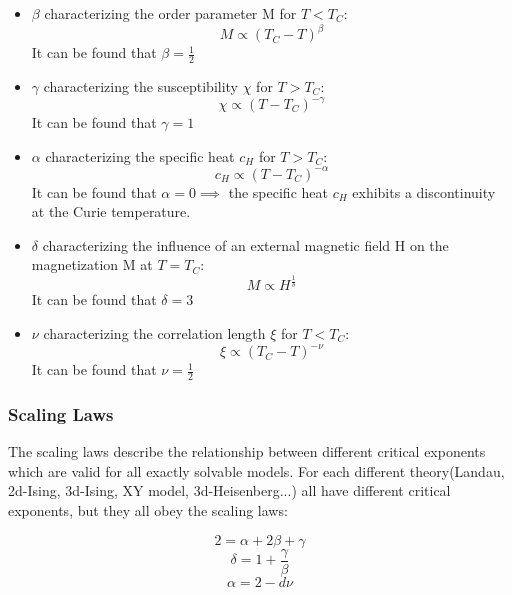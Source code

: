 \documentclass[10pt]{article} %
\begin{document}
\begin{itemize}
\item $\beta$ characterizing the order parameter M for $T < T_C$:
\begin{equation}
M \propto (T_C - T)^\beta
\end{equation}
It can be found that $\beta = \frac{1}{2}$

\item $\gamma$ characterizing the susceptibility $\chi$ for $T > T_C$:
\begin{equation}
\chi \propto (T - T_C)^{-\gamma}
\end{equation}
It can be found that $\gamma = 1$

\item $\alpha$ characterizing the specific heat $c_H$ for $T > T_C$:
\begin{equation}
c_H \propto (T - T_C)^{-\alpha}
\end{equation}
It can be found that $\alpha = 0 \implies$ the specific heat $c_H$ exhibits a discontinuity at the Curie temperature.

\item $\delta$ characterizing the influence of an external magnetic field H on the magnetization M at $T = T_C$:
\begin{equation}
M \propto H^{\frac{1}{\delta}}
\end{equation}
It can be found that $\delta = 3$

\item $\nu$ characterizing the correlation length $\xi$ for $T < T_C$:
\begin{equation}
\xi \propto (T_C - T)^{-\nu}
\end{equation}
It can be found that $\nu = \frac{1}{2}$
\end{itemize}

\subsubsection{Scaling Laws}
The scaling laws describe the relationship between different critical exponents which are valid for all exactly solvable models. For each different theory(Landau, 2d-Ising, 3d-Ising, XY model, 3d-Heisenberg...) all have different critical exponents, but they all obey the scaling laws:

\begin{equation}
2 = \alpha + 2\beta + \gamma
\end{equation}
\begin{equation}
\delta = 1 + \frac{\gamma}{\beta}
\end{equation}
\begin{equation}
\alpha = 2 - d\nu
\end{equation}
\end{document}

